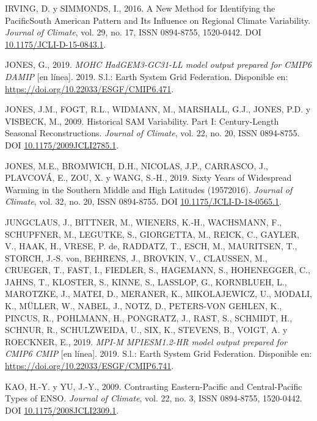 \documentclass[12pt,oneside,a4paper]{reedthesis}
\newlength{\cslhangindent}
\newenvironment{CSLReferences}[2] %
 {%
  \setlength{\parindent}{0pt}
  \ifodd #1 \everypar{\setlength{\hangindent}{\cslhangindent}}\ignorespaces\fi
  \ifnum #2 > 0
  \setlength{\parskip}{#2\baselineskip}
  \fi
 }%
 {}
\begin{document}
\begin{CSLReferences}{1}{0}
\leavevmode{}%
IRVING, D. y SIMMONDS, I., 2016. A {New Method} for {Identifying} the {Pacific}{\textendash}{South American Pattern} and {Its Influence} on {Regional Climate Variability}. \emph{Journal of Climate}, vol. 29, no. 17, ISSN 0894-8755, 1520-0442. DOI \href{https://doi.org/10.1175/JCLI-D-15-0843.1}{10.1175/JCLI-D-15-0843.1}.

\leavevmode{}%
JONES, G., 2019. \emph{MOHC HadGEM3-GC31-LL model output prepared for CMIP6 DAMIP} {[}en línea{]}. 2019. S.l.: Earth System Grid Federation. Disponible en: \url{https://doi.org/10.22033/ESGF/CMIP6.471}.

\leavevmode{}%
JONES, J.M., FOGT, R.L., WIDMANN, M., MARSHALL, G.J., JONES, P.D. y VISBECK, M., 2009. Historical {SAM Variability}. {Part I}: {Century-Length Seasonal Reconstructions}. \emph{Journal of Climate}, vol. 22, no. 20, ISSN 0894-8755. DOI \href{https://doi.org/10.1175/2009JCLI2785.1}{10.1175/2009JCLI2785.1}.

\leavevmode{}%
JONES, M.E., BROMWICH, D.H., NICOLAS, J.P., CARRASCO, J., PLAVCOVÁ, E., ZOU, X. y WANG, S.-H., 2019. Sixty {Years} of {Widespread Warming} in the {Southern Middle} and {High Latitudes} (1957{\textendash}2016). \emph{Journal of Climate}, vol. 32, no. 20, ISSN 0894-8755. DOI \href{https://doi.org/10.1175/JCLI-D-18-0565.1}{10.1175/JCLI-D-18-0565.1}.

\leavevmode{}%
JUNGCLAUS, J., BITTNER, M., WIENERS, K.-H., WACHSMANN, F., SCHUPFNER, M., LEGUTKE, S., GIORGETTA, M., REICK, C., GAYLER, V., HAAK, H., VRESE, P. de, RADDATZ, T., ESCH, M., MAURITSEN, T., STORCH, J.-S. von, BEHRENS, J., BROVKIN, V., CLAUSSEN, M., CRUEGER, T., FAST, I., FIEDLER, S., HAGEMANN, S., HOHENEGGER, C., JAHNS, T., KLOSTER, S., KINNE, S., LASSLOP, G., KORNBLUEH, L., MAROTZKE, J., MATEI, D., MERANER, K., MIKOLAJEWICZ, U., MODALI, K., MÜLLER, W., NABEL, J., NOTZ, D., PETERS-VON GEHLEN, K., PINCUS, R., POHLMANN, H., PONGRATZ, J., RAST, S., SCHMIDT, H., SCHNUR, R., SCHULZWEIDA, U., SIX, K., STEVENS, B., VOIGT, A. y ROECKNER, E., 2019. \emph{MPI-M MPIESM1.2-HR model output prepared for CMIP6 CMIP} {[}en línea{]}. 2019. S.l.: Earth System Grid Federation. Disponible en: \url{https://doi.org/10.22033/ESGF/CMIP6.741}.

\leavevmode{}%
KAO, H.-Y. y YU, J.-Y., 2009. Contrasting {Eastern-Pacific} and {Central-Pacific Types} of {ENSO}. \emph{Journal of Climate}, vol. 22, no. 3, ISSN 0894-8755, 1520-0442. DOI \href{https://doi.org/10.1175/2008JCLI2309.1}{10.1175/2008JCLI2309.1}.


\end{CSLReferences}
\end{document}
